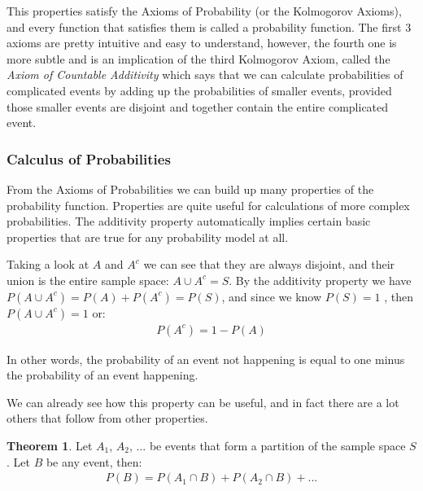 \documentclass[
  oneside,
  11pt, a4paper,
  footinclude=true,
  headinclude=true,
  cleardoublepage=empty
]{scrbook}
\theoremstyle{definition}
\theoremstyle{definition}
\newtheorem{theorem}{Theorem}[section]
\begin{document}
                This properties satisfy the Axioms of Probability (or the Kolmogorov Axioms), and every function that satisfies them is called a probability function. The first 3 axioms are pretty intuitive and easy to understand, however, the fourth one is more subtle and is an implication of the third Kolmogorov Axiom, called the \emph{Axiom of Countable Additivity} which says that we can calculate probabilities of complicated events by adding up the probabilities of smaller events, provided those smaller events are disjoint and together contain the entire complicated event.
        
        \subsubsection{Calculus of Probabilities}
            
            From the Axioms of Probabilities we can build up many properties of the probability function. Properties are quite useful for calculations of more complex probabilities. The additivity property automatically implies certain basic properties that are true for any probability model at all.
            
            Taking a look at $A$ and $A^c$ we can see that they are always disjoint, and their union is the entire sample space: $A \cup A^c = S$. By the additivity property we have $P(A \cup A^c) = P(A) + P(A^c) = P(S)$, and since we know $P(S) = 1$ , then $P(A \cup A^c) = 1$ or:
            \begin{align}
                P(A^c) = 1 - P(A)
            \end{align}{}
            
            In other words, the probability of an event not happening is equal to one minus the probability of an event happening.
            
            We can already see how this property can be useful, and in fact there are a lot others that follow from other properties.
            
            \begin{theorem}{Let $A_1$, $A_2$, ... be events that form a partition of the sample space $S$. Let $B$ be any event, then:}
                \begin{align*}
                    P(B) = P(A_1 \cap B) + P(A_2 \cap B) + ...
                \end{align*}{}
            \end{theorem}
            
\end{document}
